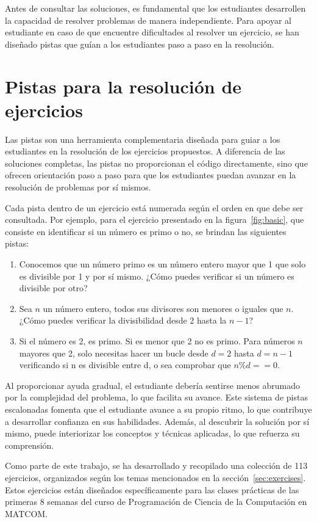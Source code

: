 Antes de consultar las soluciones, es fundamental que los estudiantes desarrollen la capacidad de resolver problemas de manera independiente. Para apoyar al estudiante en caso de que encuentre dificultades al resolver un ejercicio, se han diseñado pistas que guían a los estudiantes paso a paso en la resolución.

\section{Pistas para la resolución de ejercicios}

Las pistas son una herramienta complementaria diseñada para guiar a los estudiantes en la resolución de los ejercicios propuestos. A diferencia de las soluciones completas, las pistas no proporcionan el código directamente, sino que ofrecen orientación paso a paso para que los estudiantes puedan avanzar en la resolución de problemas por sí mismos. 

Cada pista dentro de un ejercicio está numerada según el orden en que debe ser consultada. Por ejemplo, para el ejercicio presentado en la figura~\ref{fig:basic}, que consiste en identificar si un número es primo o no, se brindan las siguientes pistas:
\begin{enumerate}
    \item Conocemos que un número primo es un número entero mayor que 1 que solo es divisible por 1 y por sí mismo. ¿Cómo puedes verificar si un número es divisible por otro?
    \item Sea \(n\) un número entero, todos sus divisores son menores o iguales que \(n\). ¿Cómo puedes verificar la divisibilidad desde 2 hasta la \(n - 1\)?
    \item Si el número es 2, es primo. Si es menor que 2 no es primo. Para números \(n\) mayores que 2, solo necesitas hacer un bucle desde \(d = 2\) hasta \(d = n -1\) verificando si n es divisible entre d, o sea comprobar que \(n \% d == 0\).
\end{enumerate}

Al proporcionar ayuda gradual, el estudiante debería sentirse menos abrumado por la complejidad del problema, lo que facilita su avance. Este sistema de pistas escalonadas fomenta que el estudiante avance a su propio ritmo, lo que contribuye a desarrollar confianza en sus habilidades. Además, al descubrir la solución por sí mismo, puede interiorizar los conceptos y técnicas aplicadas, lo que refuerza su comprensión.

Como parte de este trabajo, se ha desarrollado y recopilado una colección de 113 ejercicios, organizados según los temas mencionados en la sección~\ref{sec:exercises}. Estos ejercicios están diseñados específicamente para las clases prácticas de las primeras 8 semanas del curso de Programación de Ciencia de la Computación en \mbox{MATCOM}.

